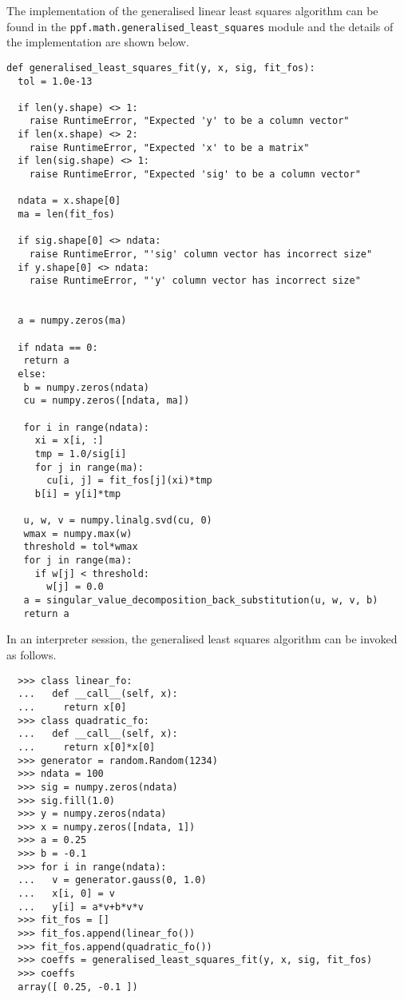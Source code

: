 The implementation of the generalised linear least squares algorithm
can be found in the \verb|ppf.math.generalised_least_squares| module
and the details of the implementation are shown below.
\begin{verbatim}
def generalised_least_squares_fit(y, x, sig, fit_fos):
  tol = 1.0e-13

  if len(y.shape) <> 1:
    raise RuntimeError, "Expected 'y' to be a column vector"
  if len(x.shape) <> 2:
    raise RuntimeError, "Expected 'x' to be a matrix"
  if len(sig.shape) <> 1:
    raise RuntimeError, "Expected 'sig' to be a column vector"

  ndata = x.shape[0]
  ma = len(fit_fos)

  if sig.shape[0] <> ndata:
    raise RuntimeError, "'sig' column vector has incorrect size"
  if y.shape[0] <> ndata:
    raise RuntimeError, "'y' column vector has incorrect size"


  a = numpy.zeros(ma)

  if ndata == 0:
   return a
  else:
   b = numpy.zeros(ndata)
   cu = numpy.zeros([ndata, ma])

   for i in range(ndata):
     xi = x[i, :]
     tmp = 1.0/sig[i]
     for j in range(ma):
       cu[i, j] = fit_fos[j](xi)*tmp
     b[i] = y[i]*tmp

   u, w, v = numpy.linalg.svd(cu, 0)
   wmax = numpy.max(w)
   threshold = tol*wmax
   for j in range(ma):
     if w[j] < threshold:
       w[j] = 0.0
   a = singular_value_decomposition_back_substitution(u, w, v, b)
   return a
\end{verbatim}
In an interpreter session, the generalised least squares algorithm can
be invoked as follows.
\begin{verbatim}
  >>> class linear_fo:
  ...   def __call__(self, x):
  ...     return x[0]
  >>> class quadratic_fo:
  ...   def __call__(self, x):
  ...     return x[0]*x[0]
  >>> generator = random.Random(1234)
  >>> ndata = 100
  >>> sig = numpy.zeros(ndata)
  >>> sig.fill(1.0)
  >>> y = numpy.zeros(ndata)
  >>> x = numpy.zeros([ndata, 1])
  >>> a = 0.25
  >>> b = -0.1
  >>> for i in range(ndata):
  ...   v = generator.gauss(0, 1.0)
  ...   x[i, 0] = v
  ...   y[i] = a*v+b*v*v
  >>> fit_fos = []
  >>> fit_fos.append(linear_fo())
  >>> fit_fos.append(quadratic_fo())
  >>> coeffs = generalised_least_squares_fit(y, x, sig, fit_fos)
  >>> coeffs
  array([ 0.25, -0.1 ])
\end{verbatim}

